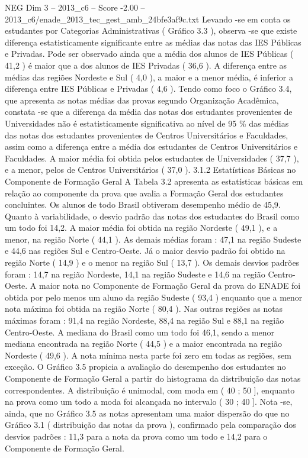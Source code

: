 \begin{textsample}{NEG Dim 3 – 2013\_c6 – Score -2.00 – 2013\_c6/enade\_2013\_tec\_gest\_amb\_24bfe3af9c.txt}
Levando -se em conta os estudantes por Categorias Administrativas ( Gráfico 3.3 ), observa -se que existe diferença estatisticamente significante entre as médias das notas das IES Públicas e Privadas.
Pode ser observado ainda que a média dos alunos de IES Públicas ( 41,2 ) é maior que a dos alunos de IES Privadas ( 36,6 ).
A diferença entre as médias das regiões Nordeste e Sul ( 4,0 ), a maior e a menor média, é inferior a diferença entre IES Públicas e Privadas ( 4,6 ).
Tendo como foco o Gráfico 3.4, que apresenta as notas médias das provas segundo Organização Acadêmica, constata -se que a diferença da média das notas dos estudantes provenientes de Universidades não é estatisticamente significativa ao nível de 95 \% das médias das notas dos estudantes provenientes de Centros Universitários e Faculdades, assim como a diferença entre a média dos estudantes de Centros Universitários e Faculdades.
A maior média foi obtida pelos estudantes de Universidades ( 37,7 ), e a menor, pelos de Centros Universitários ( 37,0 ). 3.1.2 Estatísticas Básicas no Componente de Formação Geral A Tabela 3.2 apresenta as estatísticas básicas em relação ao componente da prova que avalia a Formação Geral dos estudantes concluintes.
Os alunos de todo Brasil obtiveram desempenho médio de 45,9.
Quanto à variabilidade, o desvio padrão das notas dos estudantes do Brasil como um todo foi 14,2.
A maior média foi obtida na região Nordeste ( 49,1 ), e a menor, na região Norte ( 44,1 ).
As demais médias foram : 47,1 na região Sudeste e 44,6 nas regiões Sul e Centro-Oeste.
Já o maior desvio padrão foi obtido na região Norte ( 14,9 ) e o menor na região Sul ( 13,7 ).
Os demais desvios padrões foram : 14,7 na região Nordeste, 14,1 na região Sudeste e 14,6 na região Centro-Oeste.
A maior nota no Componente de Formação Geral da prova do ENADE foi obtida por pelo menos um aluno da região Sudeste ( 93,4 ) enquanto que a menor nota máxima foi obtida na região Norte ( 80,4 ).
Nas outras regiões as notas máximas foram : 91,4 na região Nordeste, 88,4 na região Sul e 88,1 na região Centro-Oeste.
A mediana do Brasil como um todo foi 46,1, sendo a menor mediana encontrada na região Norte ( 44,5 ) e a maior encontrada na região Nordeste ( 49,6 ).
A nota mínima nesta parte foi zero em todas as regiões, sem exceção.
O Gráfico 3.5 propicia a avaliação do desempenho dos estudantes no Componente de Formação Geral a partir do histograma da distribuição das notas correspondentes.
A distribuição é unimodal, com moda em ( 40 ; 50 ], enquanto na prova como um todo a moda foi alcançada no intervalo ( 30 ; 40 ].
Nota -se, ainda, que no Gráfico 3.5 as notas apresentam uma maior dispersão do que no Gráfico 3.1 ( distribuição das notas da prova ), confirmado pela comparação dos desvios padrões : 11,3 para a nota da prova como um todo e 14,2 para o Componente de Formação Geral.

\end{textsample}
